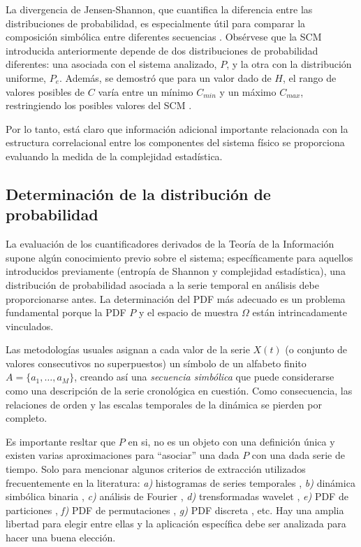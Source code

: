 La divergencia de Jensen-Shannon, que cuantifica la diferencia entre las distribuciones de probabilidad, es especialmente útil para comparar la composición simbólica entre diferentes secuencias \cite{Grosse2002}.
Obsérvese que la SCM introducida anteriormente depende de dos distribuciones de probabilidad diferentes: una asociada con el sistema analizado, $P$, y la otra con la distribución uniforme, $P_e$.
Además, se demostró que para un valor dado de $H$, el rango de valores posibles de $C$ varía entre un mínimo $C_ {min}$ y un máximo $C_ {max}$, restringiendo los posibles valores del SCM \cite{Martin2006}.

Por lo tanto, está claro que información adicional importante relacionada con la estructura correlacional entre los componentes del sistema físico se proporciona evaluando la medida de la complejidad estadística.

\subsection{Determinación de la distribución de probabilidad}

La evaluación de los cuantificadores derivados de la Teoría de la Información supone algún conocimiento previo sobre el sistema; específicamente para aquellos introducidos previamente (entropía de Shannon y complejidad estadística), una distribución de probabilidad asociada a la serie temporal en análisis debe proporcionarse antes.
La determinación del PDF más adecuado es un problema fundamental porque la PDF $P$ y el espacio de muestra $\Omega$ están intrincadamente vinculados.

Las metodologías usuales asignan a cada valor de la serie $X(t)$ (o conjunto de valores consecutivos no superpuestos) un símbolo de un alfabeto finito $A = \{a_1, \dots, a_M \}$, creando así una {\it secuencia simbólica \/} que puede considerarse como una descripción de la serie cronológica en cuestión.
Como consecuencia, las relaciones de orden y las escalas temporales de la dinámica se pierden por completo.

Es importante resltar que $P$ en si, no es un objeto con una definición única y existen varias aproximaciones para ``asociar'' una dada $P$ con una dada serie de tiempo.
Solo para mencionar algunos criterios de extracción utilizados frecuentemente en la literatura: {\it a)\/} histogramas de series temporales \cite{Martin2004}, {\it b)\/} dinámica simbólica binaria \cite{Mischaikow1999}, {\it c)\/} análisis de Fourier \cite{Powell1979}, {\it d)\/} trensformadas wavelet \cite{Blanco1998,Rosso2001}, {\it e)\/} PDF de particiones \cite{Ebeling2001}, {\it f)\/} PDF de permutaciones \cite{Pompe2002,Keller2005}, {\it g)\/} PDF discreta \cite{Amigo2007}, etc.
Hay una amplia libertad para elegir entre ellas y la aplicación específica debe ser analizada para hacer una buena elección.

